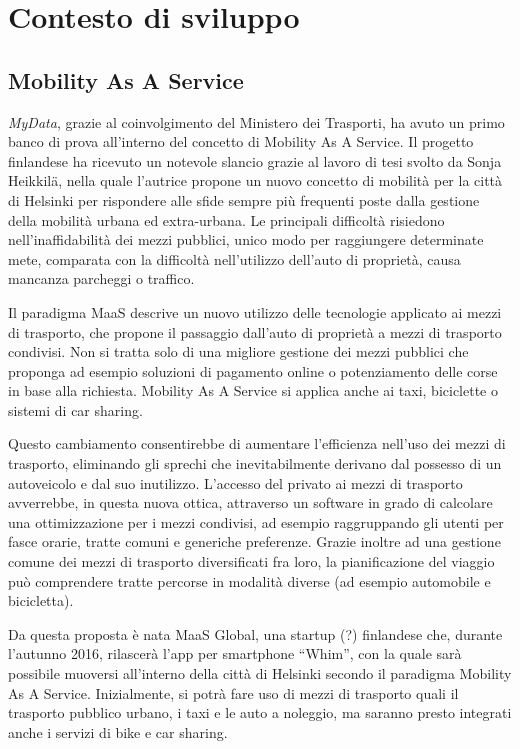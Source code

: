 \chapter{Contesto di sviluppo}
\label{capitolo2}
\thispagestyle{empty}

\cite{mydatawebsite}
\section{Mobility As A Service}
\textit{MyData}, grazie al coinvolgimento del Ministero dei Trasporti, ha avuto un primo banco di prova all’interno del concetto di Mobility As A Service. Il progetto finlandese ha ricevuto un notevole slancio grazie al lavoro di tesi svolto da Sonja Heikkil\"a\cite{mastersonjaheikkil}, nella quale l’autrice propone un nuovo concetto di mobilit\`a per la citt\`a di Helsinki per rispondere alle sfide sempre pi\`u frequenti poste dalla gestione della mobilit\`a urbana ed extra-urbana. Le principali difficolt\`a risiedono nell’inaffidabilit\`a dei mezzi pubblici, unico modo per raggiungere determinate mete, comparata con la difficolt\`a nell'utilizzo dell’auto di propriet\`a, causa mancanza parcheggi o traffico.

Il paradigma MaaS descrive un nuovo utilizzo delle tecnologie applicato ai mezzi di trasporto, che propone il passaggio dall’auto di propriet\`a a mezzi di trasporto condivisi. Non si tratta solo di una migliore gestione dei mezzi pubblici che proponga ad esempio soluzioni di pagamento online o potenziamento delle corse in base alla richiesta. Mobility As A Service si applica anche ai taxi, biciclette o sistemi di car sharing. 

Questo cambiamento consentirebbe di aumentare l’efficienza nell’uso dei mezzi di trasporto, eliminando gli sprechi che inevitabilmente derivano dal possesso di un autoveicolo e dal suo inutilizzo. L’accesso del privato ai mezzi di trasporto avverrebbe, in questa nuova ottica, attraverso un software in grado di calcolare una ottimizzazione per i mezzi condivisi, ad esempio raggruppando gli utenti per fasce orarie, tratte comuni e generiche preferenze. Grazie inoltre ad una gestione comune dei mezzi di trasporto diversificati fra loro, la pianificazione del viaggio pu\`o comprendere tratte percorse in modalit\`a diverse (ad esempio automobile e bicicletta).

Da questa proposta \`e nata MaaS Global\cite{maasglobal}, una startup (?) finlandese che, durante l’autunno 2016, rilascer\`a l’app per smartphone “Whim”, con la quale sar\`a possibile muoversi all’interno della citt\`a di Helsinki secondo il paradigma Mobility As A Service. Inizialmente, si potr\`a fare uso di mezzi di trasporto quali il trasporto pubblico urbano, i taxi e le auto a noleggio, ma saranno presto integrati anche i servizi di bike e car sharing.

